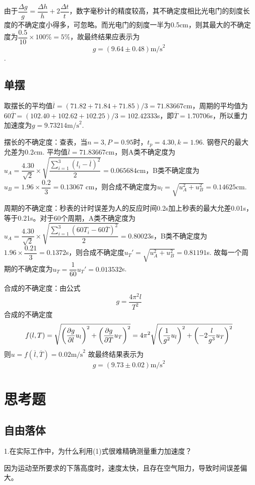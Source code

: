 \documentclass[11pt]{article}
\begin{document}
由于$ \dfrac{\Delta g}{g}=\dfrac{\Delta h}{h}+2\dfrac{\Delta t}{t} $，数字毫秒计的精度较高，其不确定度相比光电门的刻度长度的不确定度小得多，可忽略。而光电门的刻度一半为0.5cm，则其最大的不确定度为$ \dfrac{0.5}{10}\times 100\% =5\%$，故最终结果应表示为
$$ g=(9.64 \pm 0.48) \text{m/s}^2$$.
\subsection{单摆}
取摆长的平均值$ \overline{l} =(71.82+71.84+71.85)/3=71.83667 $cm，周期的平均值为$ 60\overline{T}=(102.40+102.62+102.25)/3=102.42333 $s，即$ \overline{T}=1.70706 $s，所以重力加速度为$ g=9.73214\text{m/s}^2 $.

摆长的不确定度：查表，当$ n=3,P=0.95 $时，$ t_p=4.30,k=1.96 $. 钢卷尺的最大允差为0.2cm. 平均值$ \overline{l}=71.83667 $cm，则A类不确定度为$ u_A=\dfrac{4.30}{\sqrt{2}}\times \sqrt{\dfrac{{\displaystyle \sum}_{i=1}^{3}(l_i-\overline{l})^2  }{2}}=0.065684$cm，B类不确定度为$ u_B=1.96\times \dfrac{0.2}{3} = 0.13067 $ cm，则合成不确定度为$ u_l=\sqrt{u_A^2+u_B^2}=0.14625 $cm.

周期的不确定度：秒表的计时误差为人的反应时间0.2s加上秒表的最大允差0.01s，等于0.21s。对于60个周期，A类不确定度为$ u_A=\dfrac{4.30}{\sqrt{2}}\times \sqrt{\dfrac{{\displaystyle \sum}_{i=1}^{3}(60T_i-60\overline{T})^2  }{2}}=0.80023$s，B类不确定度为$ 1.96\times \dfrac{0.21}{3}=0.1372 $s，则合成不确定度$ u_T'=\sqrt{u_A^2+u_B^2}=0.81191 $s. 故每一个周期的不确定度为$ u_T=\dfrac{1}{60}u_T'=0.013532 $s.

合成的不确定度：由公式
$$ g=\dfrac{4\pi^2l}{T^2} $$
合成的不确定度
	$$f(l,T)=\sqrt{\left ( \dfrac{\partial g}{\partial l}u_l \right )^2 +\left ( \dfrac{\partial g}{\partial T}u_T \right )^2 } \\
	=4\pi^2\sqrt{\left ( \dfrac{1}{g^2} u_l \right )^2 +\left ( -2\dfrac{l}{g^3} u_T \right )^2 }  $$
则$ u=f(\overline{l},\overline{T})=0.02 \text{m/s}^2$
故最终结果表示为
$$ g=(9.73\pm 0.02)\text{m/s}^2 $$

\section{思考题}
\subsection{自由落体}
1.在实际工作中，为什么利用(1)式很难精确测量重力加速度？

因为运动至所要求的下落高度时，速度太快，且存在空气阻力，导致时间误差偏大。
\end{document}
